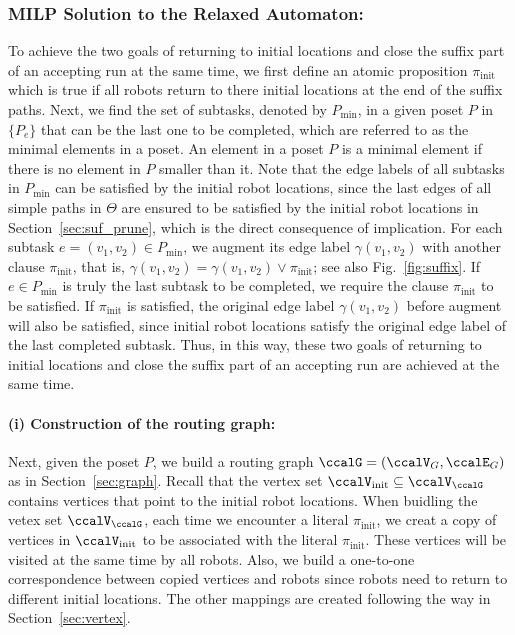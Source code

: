 \documentclass[Afour,sageh,times]{sagej}
\begin{document}
{{{  \subsubsection{MILP Solution to the Relaxed Automaton:}\label{sec:suf_milp} To achieve the two goals of returning to initial locations and close the suffix part of an accepting run at the same time, we first define an atomic proposition $\pi_{\text{init}}$ which is true if all robots return to there initial locations at the end of the suffix paths. Next, we find the set of subtasks, denoted by $P_{\text{min}}$, in a given poset $P$ in $\{P_e\}$ that can be the last one to be completed, which are referred to as the minimal elements in a poset. An element in a poset $P$  is a minimal element if there is no element in $P$ smaller than it. Note that the edge labels of all subtasks in $P_{\text{min}}$ can be satisfied by the initial robot locations, since the last edges of all simple paths in $\Theta$ are ensured to be satisfied by the initial robot locations in Section~\ref{sec:suf_prune}, which is the direct consequence of implication.  For each subtask $e = (v_1, v_2) \in P_{\text{min}}$, we augment its edge label $\gamma(v_1, v_2)$ with another clause $\pi_{\text{init}}$, that is, $\gamma(v_1, v_2) = \gamma(v_1, v_2) \vee \pi_{\text{init}}$; see also Fig.~\ref{fig:suffix}. If $e \in P_{\text{min}}$ is truly the last subtask to be completed, we require the clause $ \pi_{\text{init}}$  to be satisfied. If $\pi_{\text{init}}$ is satisfied, the original edge label $\gamma(v_1, v_2)$ before augment will also be satisfied, since initial robot locations satisfy the original edge label of the last completed subtask. Thus, in this way, these two goals of returning to initial locations and close the suffix part of an accepting run are achieved  at the same time.
  \paragraph{(i) Construction of the routing graph:}   Next, given the poset $P$, we build a routing graph $\ccalG = (\ccalV_G, \ccalE_G)$ as in Section~\ref{sec:graph}. Recall that the vertex set $\ccalV_\text{init} \subseteq \ccalV_\ccalG$ contains vertices that point to the initial robot locations. When buidling the vetex set $\ccalV_\ccalG$, each time we encounter a literal $\pi_{\text{init}}$, we creat a copy of vertices in $\ccalV_{\text{init}}$ to be associated with the literal $\pi_{\text{init}}$. These vertices will be visited at the same time by all robots.  Also, we build a one-to-one correspondence between copied vertices and robots since  robots need to return to different initial locations. The other  mappings are created following the way in Section~\ref{sec:vertex}.

}}}
\end{document}
